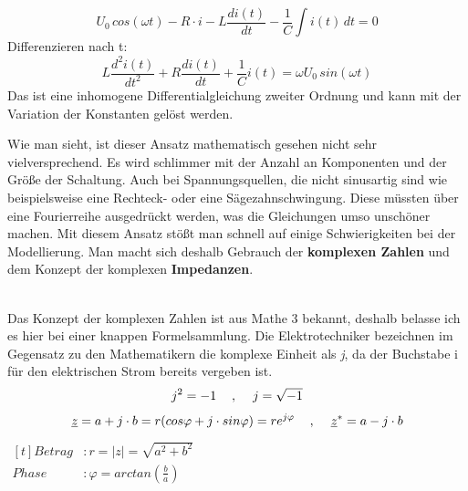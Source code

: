 \documentclass{article}
\begin{document}
\begin{mdframed}
\begin{minipage}{0.55\textwidth}
\[U_0\,cos(\omega t) - R \cdot i - L\frac{di(t)}{dt} - \frac{1}{C}\int i(t)\,dt = 0\]
Differenzieren nach t:
\[L\frac{d^2i(t)}{dt^2}+R\frac{di(t)}{dt}+\frac{1}{C}i(t) = \omega U_0\,sin(\omega t)\]
Das ist eine inhomogene Differentialgleichung zweiter Ordnung und kann mit der Variation der Konstanten gelöst werden.
\vspace{1\baselineskip}
\end{minipage}
\hspace{1\baselineskip}
\raisebox{-0.5\height}{}
\justify
Wie man sieht, ist dieser Ansatz mathematisch gesehen nicht sehr vielversprechend. Es wird schlimmer mit der Anzahl an Komponenten und der Größe der Schaltung. Auch bei Spannungsquellen, die nicht sinusartig sind wie beispielsweise eine Rechteck- oder eine Sägezahnschwingung. Diese müssten über eine Fourierreihe ausgedrückt werden, was die Gleichungen umso unschöner machen. Mit diesem Ansatz stößt man schnell auf einige Schwierigkeiten bei der Modellierung. Man macht sich deshalb Gebrauch der \textbf{komplexen Zahlen} und dem Konzept der komplexen \textbf{Impedanzen}.
\end{mdframed}
\vspace{0.8\baselineskip}

\begin{mdframed}
\centering
\vspace{0.2\baselineskip}
\\
\vspace{0.2\baselineskip}
\justify
Das Konzept der komplexen Zahlen ist aus Mathe 3 bekannt, deshalb belasse ich es hier bei einer knappen Formelsammlung. Die Elektrotechniker bezeichnen im Gegensatz zu den Mathematikern die komplexe Einheit als \textit{j}, da der Buchstabe i für den elektrischen Strom bereits vergeben ist.
\[j^2 = -1 \hspace{1\baselineskip},\hspace{1\baselineskip} j = \sqrt{-1}\]
\[\underline{z} = a + j \cdot b = r(cos\varphi + j \cdot sin\varphi) = re^{j\varphi} \hspace{1\baselineskip},\hspace{1\baselineskip} \underline{z}^* = a - j \cdot b\]
\centering
\raisebox{-0.5\height}{}
$\begin{aligned}[t]
    Betrag&: r = |z| = \sqrt{a^2+b^2}\\
    Phase&: \varphi = arctan(\frac{b}{a})
\end{aligned}$
\end{mdframed}
\vspace{0.8\baselineskip}
\end{document}
